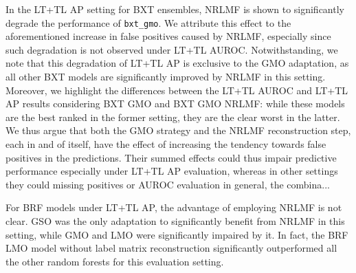 In the LT+TL AP setting for BXT ensembles, NRLMF is shown to significantly degrade the performance of \texttt{bxt\_gmo}.
We attribute this effect to the aforementioned increase in false positives caused by NRLMF, especially since such degradation is not observed under LT+TL AUROC. Notwithstanding, we note that this degradation of LT+TL AP is exclusive to the GMO adaptation, as all other BXT models are significantly improved by NRLMF in this setting. Moreover, we highlight the differences between the LT+TL AUROC and LT+TL AP results considering BXT GMO and BXT GMO NRLMF: while these models are the best ranked in the former setting, they are the clear worst in the latter. We thus argue that both the GMO strategy and the NRLMF reconstruction step, each in and of itself, have the effect of increasing the tendency towards false positives in the predictions. Their summed effects could thus impair predictive performance especially under LT+TL AP evaluation, whereas in other settings they could  missing positives or AUROC evaluation in general, the combina...  %



%

For BRF models under LT+TL AP, the advantage of employing NRLMF is not clear. GSO was the only adaptation to significantly benefit from NRLMF in this setting, while GMO and LMO were significantly impaired by it. In fact, the BRF LMO model without label matrix reconstruction significantly outperformed all the other random forests for this evaluation setting.


